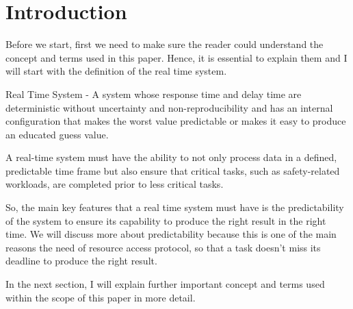 \section{Introduction}

Before we start, first we need to make sure the reader could understand the concept and terms used in this paper. Hence, it is essential to explain them and I will start with the definition of the real time system.\par 
Real Time System - A system whose response time and delay time are deterministic without uncertainty and non-reproducibility and has an internal configuration that makes the worst value predictable or makes it easy to produce an educated guess value\cite{b1}.\par

A real-time system must have the ability to not only process data in a defined, predictable time frame but also ensure that critical tasks, such as safety-related workloads, are completed prior to less critical tasks\cite{b2}.

So, the main key features that a real time system must have is the predictability of the system to ensure its capability to produce the right result in the right time. We will discuss more about predictability because this is one of the main reasons the need of resource access protocol, so that a task doesn't miss its deadline to produce the right result.\par

In the next section, I will explain further important concept and terms used within the scope of this paper in more detail.



 
  
 
 





